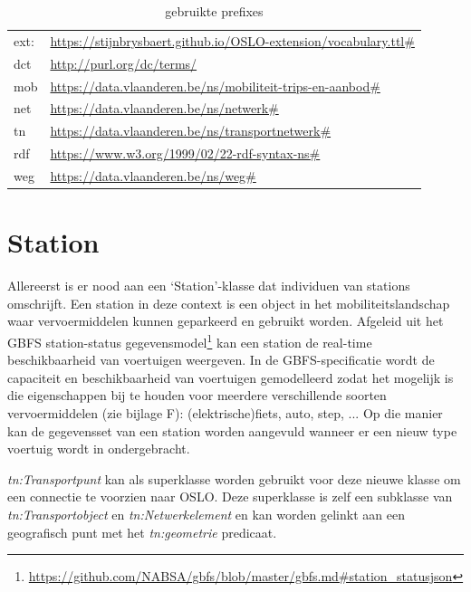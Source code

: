 \begin{table}[]
\centering
\caption{gebruikte prefixes}
\label{tab:oslo_prefixes}
\begin{tabular}{ll}
ext:     & \url{https://stijnbrysbaert.github.io/OSLO-extension/vocabulary.ttl#} \\
dct   & \url{http://purl.org/dc/terms/} \\
mob   & \url{https://data.vlaanderen.be/ns/mobiliteit-trips-en-aanbod#} \\
net   & \url{https://data.vlaanderen.be/ns/netwerk#}         \\
tn    & \url{https://data.vlaanderen.be/ns/transportnetwerk#} \\
rdf   & \url{https://www.w3.org/1999/02/22-rdf-syntax-ns#} \\
weg   & \url{https://data.vlaanderen.be/ns/weg#}
\end{tabular}
\end{table}

\section{Station}
Allereerst is er nood aan een `Station'-klasse dat individuen van stations omschrijft. Een station in deze context is een object in het mobiliteitslandschap waar vervoermiddelen kunnen geparkeerd en gebruikt worden. Afgeleid uit het GBFS station-status gegevensmodel\footnote{\url{https://github.com/NABSA/gbfs/blob/master/gbfs.md\#station_statusjson}} kan een station de real-time beschikbaarheid van voertuigen weergeven. In de GBFS-specificatie wordt de capaciteit en beschikbaarheid van voertuigen gemodelleerd zodat het mogelijk is die eigenschappen bij te houden voor meerdere verschillende soorten vervoermiddelen (zie bijlage F): (elektrische)fiets, auto, step, ... Op die manier kan de gegevensset van een station worden aangevuld wanneer er een nieuw type voertuig wordt in ondergebracht.

\textit{tn:Transportpunt} kan als superklasse worden gebruikt voor deze nieuwe klasse om een connectie te voorzien naar OSLO. Deze superklasse is zelf een subklasse van \textit{tn:Transportobject} en \textit{tn:Netwerkelement} en kan worden gelinkt aan een geografisch punt met het \textit{tn:geometrie} predicaat.

